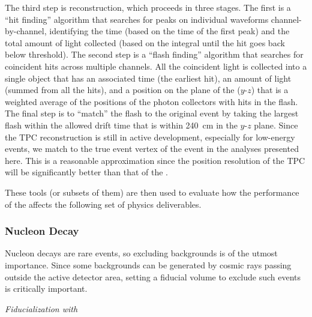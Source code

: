 The third step is reconstruction, which proceeds in three stages. The first is a ``hit finding'' algorithm that searches for peaks on individual waveforms channel-by-channel, identifying the time (based on the time of the first peak) and the total amount of light collected (based on the integral until the hit goes back below threshold). The second step is a ``flash finding'' algorithm that searches for coincident hits across multiple channels. All the coincident light is collected into a single object that has an associated time (the earliest hit), an amount of light (summed from all the hits), and a position on the plane of the  ($y$-$z$) that is a weighted average of the positions of the photon collectors with hits in the flash. %
The final step is to ``match'' the flash to the original event by taking the largest flash within the allowed drift time that is within \SI{240}{cm} in the $y$-$z$ plane. Since the TPC reconstruction is still in active development, especially for low-energy events, we match to the true event %
vertex of the event in the analyses presented here. This is a reasonable approximation since the position resolution of the TPC will be significantly better than that of the . 

These tools (or subsets of them) are then used to evaluate how the performance of the  affects the following set of physics deliverables.

\subsubsection{Nucleon Decay}
\label{subsec:fdsp-pd-simphys-ndk}

Nucleon decays are rare events, so excluding backgrounds is of the utmost importance. Since some backgrounds can be generated by cosmic rays passing outside the active detector area, setting a fiducial volume to exclude such events is critically important.

\textit{Fiducialization with \tzero}\nopagebreak


